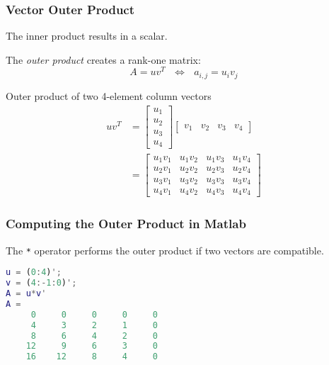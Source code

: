 \documentclass[10pt]{beamer}
\begin{document}
\begin{frame}
\frametitle{Vector Outer Product}

\begin{minipage}[t]{0.45\textwidth}
The inner product results in a scalar.

The \emph{outer product} creates a rank-one matrix:
\begin{equation*}
    A = u v^T\ \ \ \Longleftrightarrow\ \ \
    a_{i,j} = u_i v_j
\end{equation*}
\end{minipage}
\hspace{5ex}
\begin{minipage}[t]{0.45\textwidth}
\begin{example}{Outer product of two 4-element column vectors}
\begin{align*}
    u v^T &= \begin{bmatrix}u_1\\ u_2\\ u_3\\ u_4\end{bmatrix}
             \begin{bmatrix}v_1&  v_2&  v_3& v_4\end{bmatrix}   \\[8pt]
          &= \begin{bmatrix} u_1 v_1 & u_1 v_2 & u_1 v_3 & u_1 v_4 \\
                    u_2 v_1 & u_2 v_2 & u_2 v_3 & u_2 v_4 \\
                    u_3 v_1 & u_3 v_2 & u_3 v_3 & u_3 v_4 \\
                    u_4 v_1 & u_4 v_2 & u_4 v_3 & u_4 v_4
              \end{bmatrix}
\end{align*}
\end{example}
\end{minipage}

\end{frame}
\begin{frame}[fragile]
\frametitle{Computing the Outer Product in Matlab}

The \verb|*| operator performs the outer product
if two vectors are compatible.
\begin{lstlisting}[language=matlab]
u = (0:4)';
v = (4:-1:0)';
A = u*v'
A =
     0     0     0     0     0
     4     3     2     1     0
     8     6     4     2     0
    12     9     6     3     0
    16    12     8     4     0
\end{lstlisting}


\end{frame}
\end{document}
